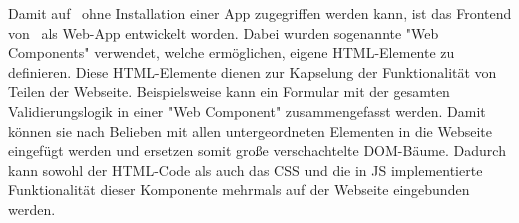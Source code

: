 \label{sec:webcomponents}

Damit auf \ZELIA\ ohne Installation einer App zugegriffen werden kann, ist das Frontend von \ZELIA\ als Web-App entwickelt worden. 
Dabei wurden sogenannte "Web Components" verwendet, welche ermöglichen, eigene HTML-Elemente zu definieren. 
Diese HTML-Elemente dienen zur Kapselung der Funktionalität von Teilen der Webseite.
Beispielsweise kann ein Formular mit der gesamten Validierungslogik in einer "Web Component" zusammengefasst werden.
Damit können sie nach Belieben mit allen untergeordneten Elementen in die Webseite eingefügt werden und ersetzen somit große verschachtelte DOM-Bäume.
Dadurch kann sowohl der HTML-Code als auch das CSS und die in JS implementierte Funktionalität dieser Komponente mehrmals auf der Webseite eingebunden werden. \cite{MDNWebCustomElements}


\pagebreak

